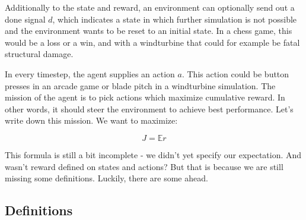 \documentclass[hyperref,beleg]{cgvpub}
\begin{document}
Additionally to the state and reward, an environment can optionally send out a done signal \(d\), which indicates a state in which further simulation is not possible and the environment wants to be reset to an initial state. In a chess game, this would be a loss or a win, and with a windturbine that could for example be fatal structural damage. 

In every timestep, the agent supplies an action \(a\). This action could be button presses in an arcade game or blade pitch in a windturbine simulation. The mission of the agent is to pick actions which maximize cumulative reward. In other words, it should steer the environment to achieve best performance. Let's write down this mission. We want to maximize:

\begin{equation}
J = \mathbb{E}r
\end{equation}

This formula is still a bit incomplete - we didn't yet specify our expectation. And wasn't reward defined on states and actions? But that is because we are still missing some definitions. Luckily, there are some ahead.

\subsection{Definitions}
\label{sec:definitions}
\end{document}
